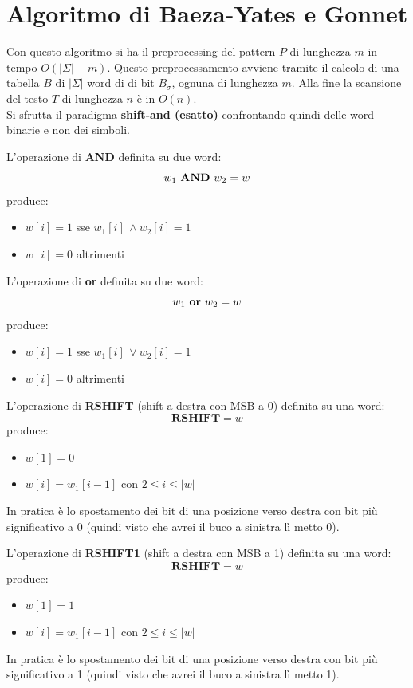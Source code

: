 \documentclass[a4paper,12pt, oneside]{book}
\begin{document}
\section{Algoritmo di Baeza-Yates e Gonnet}
Con questo algoritmo si ha il preprocessing del pattern $P$ di lunghezza $m$ in
tempo $O(|\Sigma|+m)$. Questo preprocessamento avviene tramite il calcolo di una
tabella $B$ di $|\Sigma|$ word di di bit $B_\sigma$, ognuna di lunghezza
$m$. Alla fine la scansione del testo $T$ di lunghezza $n$ è in $O(n)$.\\
Si sfrutta il paradigma \textbf{shift-and (esatto)} confrontando quindi delle
word binarie e non dei simboli.
\begin{definizione}
  L'operazione di \textbf{AND} definita su due word:
  \[w_1\mbox{ \textbf{AND} }w_2=w\]
  produce:
  \begin{itemize}
    \item $w[i]=1$ sse $w_1[i]\,\land w_2[i]=1$
    \item $w[i]=0$ altrimenti
  \end{itemize}
\end{definizione}
\begin{definizione}
  L'operazione di \textbf{or} definita su due word:
  \[w_1\mbox{ \textbf{or} }w_2=w\]
  produce:
  \begin{itemize}
    \item $w[i]=1$ sse $w_1[i]\,\lor w_2[i]=1$
    \item $w[i]=0$ altrimenti
  \end{itemize}
\end{definizione}
\begin{definizione}
  L'operazione di \textbf{RSHIFT} (shift a destra con MSB a 0) definita su una
  word: 
  \[\mathbf{RSHIFT}=w\]
  produce:
  \begin{itemize}
    \item $w[1]=0$
    \item $w[i]=w_1[i-1]$ con $2\leq i\leq |w|$
  \end{itemize}
  In pratica è lo spostamento dei bit di una posizione verso destra con bit più
  significativo a 0 (quindi visto che avrei il buco a sinistra lì metto 0).
\end{definizione}
\begin{definizione}
  L'operazione di \textbf{RSHIFT1} (shift a destra con MSB a 1) definita su una word:
  \[\mathbf{RSHIFT}=w\]
  produce:
  \begin{itemize}
    \item $w[1]=1$
    \item $w[i]=w_1[i-1]$ con $2\leq i\leq |w|$
  \end{itemize}
  In pratica è lo spostamento dei bit di una posizione verso destra con bit più
  significativo a 1 (quindi visto che avrei il buco a sinistra lì metto 1).
\end{definizione}
\end{document}
